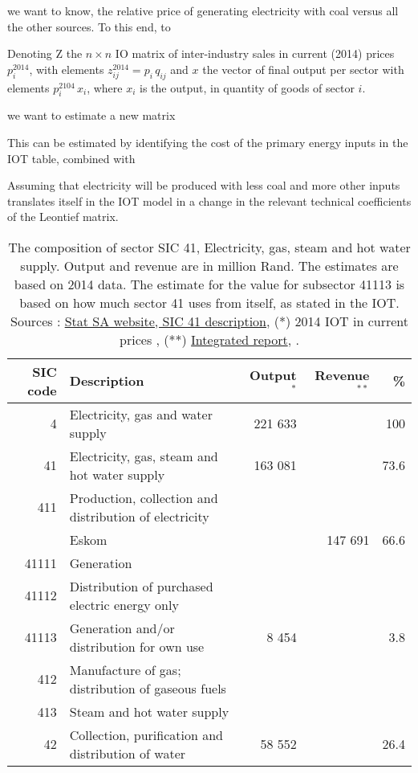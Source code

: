 \documentclass[12pt,english]{article}
\begin{document}
we want to know, the relative price of generating electricity with coal versus all the other sources. To this end, to  

Denoting Z the $n\times n$ IO matrix of inter-industry sales in current (2014) prices $p^{2014}_i$, with elements $z^{2014}_{ij} = p_i \, q_{ij}$ and $x$ the vector of final output per sector with elements $p_i^{2104} \, x_i$, where $x_i$ is the output, in quantity of goods of sector $i$.  

we want to estimate a new matrix 



 This can be estimated by identifying the cost of the primary energy inputs in the IOT table, combined with 

Assuming that electricity will be produced with less coal and more other inputs translates itself in the IOT model in a change in the relevant technical coefficients of the Leontief matrix. 



\begin{table}[ht]
	\centering
	\begin{tabular}{rlrrr}
		\toprule
		SIC code	& Description  & Output$^*$ & Revenue$^{**}$ & \%   \\ 
		\midrule
		4 & Electricity, gas and water supply & 221 633 & & 100 \\ 
		41 & Electricity, gas, steam and hot water supply &163 081& & 73.6 \\ 
		411 & Production, collection and distribution of electricity &  &  &  \\ 
		 & Eskom &  & 147 691 & 66.6 \\ 
		 41111 & Generation 	  	  	&& & \\
 		41112 & Distribution of purchased electric energy only 	&&  	&  	  	\\
		41113 & Generation and/or distribution for own use & 8 454& & 3.8\\
		412 & Manufacture of gas; distribution of gaseous fuels & & & \\ 
		413 & Steam and hot water supply &  & &\\ 
		42 & Collection, purification and distribution of water & 58 552 & &26.4 \\ 
		\bottomrule
	\end{tabular}
	\caption{\label{SIC41composition}The composition of sector SIC 41, Electricity, gas, steam and hot water supply. Output and revenue are in million Rand. The estimates are based on 2014 data. The estimate for the value for subsector 41113 is based on how much sector 41 uses from itself, as stated in the IOT. Sources : \href{http://www.statssa.gov.za/additional_services/sic/mdvdvmg4.htm}{Stat SA website, SIC 41 description}, (*) 2014 IOT in current prices \citep{IOT2014}, (**) \href{http://www.eskom.co.za/IR2015/Documents/EskomIR2015single.pdf}{Integrated report}, \citep{Eskom2014AR}.}
\end{table}
\end{document}
